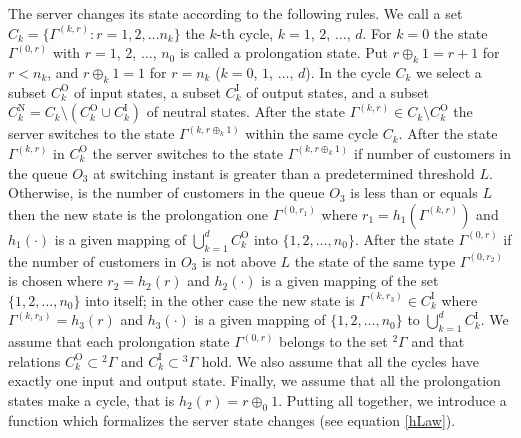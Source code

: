 \documentclass[60x84/16,10pt]{dccn}
\begin{document}
{The server changes its state according to the following rules. We call a set $C_k = \{\Gamma^{(k,r)}
\colon r=1,2,\ldots n_k\}$ the $k$-th cycle, $k=1$, $2$, $\ldots$, $d$. For $k=0$ the state
$\Gamma^{(0,r)}$ with $r=1$, $2$, $\ldots$, $n_0$ is called a prolongation state. Put $r \oplus_k 1
= r+1$ for $r<n_k$, and $r \oplus_k 1 = 1$ for $r=n_k$ ($k = 0$, $1$, $\ldots$, $d$). In the cycle
$C_k$ we select a subset $C_k^{\mathrm{O}}$ of input states, a subset $C_k^{\mathrm{I}}$ of output
states, and a subset $C_k^{\mathrm{N}} = C_k \setminus (C_k^{\mathrm{O}} \cup C_k^{\mathrm{I}})$ of
neutral states.  After the state $\Gamma^{(k,r)} \in C_k\setminus C_k^{\mathrm{O}}$ the server
switches to the state $\Gamma^{(k,r \oplus_k 1)}$ within the same cycle $C_k$.  After the state
$\Gamma^{(k,r)}$ in $C_k^{\mathrm{O}}$ the server switches to the state $\Gamma^{(k,r \oplus_k 1)}$
if number of customers in the queue $O_3$ at switching instant is greater than a predetermined
threshold $L$.  Otherwise, is the number of customers in the queue $O_3$ is less than or equals $L$
then the new state is the prolongation one $\Gamma^{(0,r_1)}$ where $r_1=h_1(\Gamma^{(k,r)})$ and
$h_1(\cdot)$ is a given mapping of $\bigcup_{k=1}^d C_k^{\mathrm{O}}$ into $\{1,2,\ldots,
n_0\}$.  After the state $\Gamma^{(0,r)}$ if the number of customers in $O_3$ is not above $L$ the
state of the same type $\Gamma^{(0,r_2)}$ is chosen where $r_2=h_2(r)$ and $h_2(\cdot)$ is a given
mapping of the set $\{1,2, \ldots, n_0\}$ into itself; in the other case the new state is
$\Gamma^{(k,r_3)} \in C_k^{\mathrm{I}}$ where $\Gamma^{(k,r_3)}=h_3(r)$ and $h_3(\cdot)$ is a 
given mapping of  $\{1,2, \ldots, n_0\}$ to $\bigcup_{k=1}^d C_k^{\mathrm{I}}$. We assume
that each prolongation state $\Gamma^{(0,r)}$ belongs to the set ${}^2 \Gamma$ and that relations
$C_k^\mathrm{O}\subset {}^2 \Gamma$ and $C_k^\mathrm{I}\subset {}^3 \Gamma$ hold. We also assume
that all the cycles have exactly one input and output state. Finally, we assume that all the
prolongation states make a cycle, that is  $h_2(r)=r\oplus_0 1$. Putting all together, we introduce
a function which formalizes the server state changes (see equation \eqref{hLaw}).


}
\end{document}
